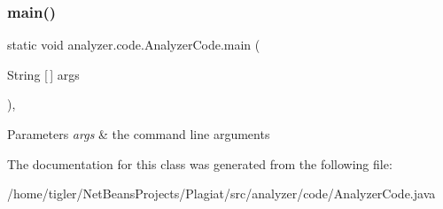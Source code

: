 \subsubsection{\texorpdfstring{main()}{main()}}
{\footnotesize\ttfamily static void analyzer.\+code.\+Analyzer\+Code.\+main (\begin{DoxyParamCaption}\item[{String \mbox{[}$\,$\mbox{]}}]{args }\end{DoxyParamCaption})\hspace{0.3cm}{\ttfamily [inline]}, {\ttfamily [static]}}


\begin{DoxyParams}{Parameters}
{\em args} & the command line arguments \\
\hline
\end{DoxyParams}


The documentation for this class was generated from the following file\+:\begin{DoxyCompactItemize}
\item 
/home/tigler/\+Net\+Beans\+Projects/\+Plagiat/src/analyzer/code/Analyzer\+Code.\+java\end{DoxyCompactItemize}
